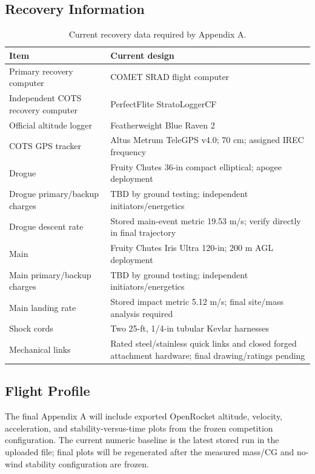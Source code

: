 \documentclass[10pt]{article}
\begin{document}
\subsection{Recovery Information}
\begin{table}[ht]
\centering
\caption{Current recovery data required by Appendix A.}
\begin{tabularx}{\linewidth}{@{}lX@{}}
\toprule
\textbf{Item} & \textbf{Current design} \\
\midrule
Primary recovery computer & COMET SRAD flight computer \\
Independent COTS recovery computer & PerfectFlite StratoLoggerCF \\
Official altitude logger & Featherweight Blue Raven 2 \\
COTS GPS tracker & Altus Metrum TeleGPS v4.0; 70 cm; assigned IREC frequency \\
Drogue & Fruity Chutes 36-in compact elliptical; apogee deployment \\
Drogue primary/backup charges & TBD by ground testing; independent initiators/energetics \\
Drogue descent rate & Stored main-event metric 19.53 m/s; verify directly in final trajectory \\
Main & Fruity Chutes Iris Ultra 120-in; 200 m AGL deployment \\
Main primary/backup charges & TBD by ground testing; independent initiators/energetics \\
Main landing rate & Stored impact metric 5.12 m/s; final site/mass analysis required \\
Shock cords & Two 25-ft, 1/4-in tubular Kevlar harnesses \\
Mechanical links & Rated steel/stainless quick links and closed forged attachment hardware; final drawing/ratings pending \\
\bottomrule
\end{tabularx}
\end{table}

\subsection{Flight Profile}
The final Appendix A will include exported OpenRocket altitude, velocity, acceleration, and stability-versus-time plots from the frozen competition configuration. The current numeric baseline is the latest stored run in the uploaded file; final plots will be regenerated after the measured mass/CG and no-wind stability configuration are frozen.
\end{document}
